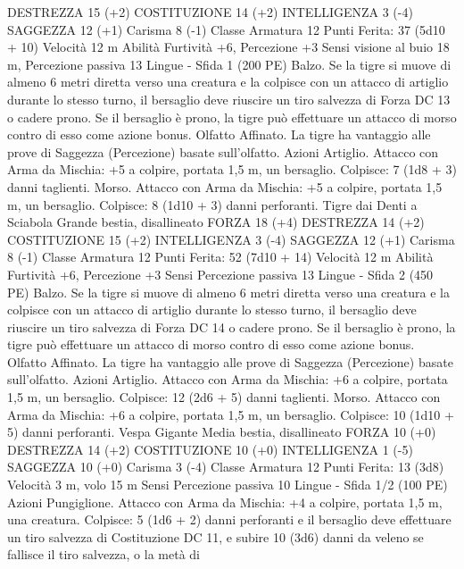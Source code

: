 \begin{multicols}{2}
DESTREZZA 15 (+2)
COSTITUZIONE 14 (+2)
INTELLIGENZA 3 (-4)
SAGGEZZA 12 (+1)
Carisma 8 (-1)
Classe Armatura 12
\hspace*{0pt}\hfill{Punti Ferita}: 37 (5d10 + 10)
Velocità 12 m
Abilità Furtività +6, Percezione +3
Sensi visione al buio 18 m, Percezione passiva 13
Lingue -
Sfida 1 (200 PE)
Balzo. Se la tigre si muove di almeno 6 metri diretta verso una
creatura e la colpisce con un attacco di artiglio durante lo stesso
turno, il bersaglio deve riuscire un tiro salvezza di Forza DC 13 o
cadere prono. Se il bersaglio è prono, la tigre può effettuare un
attacco di morso contro di esso come azione bonus.
Olfatto Affinato. La tigre ha vantaggio alle prove di Saggezza
(Percezione) basate sull’olfatto.
Azioni
Artiglio. Attacco con Arma da Mischia: +5 a colpire, portata 1,5
m, un bersaglio.
Colpisce: 7 (1d8 + 3) danni taglienti.
Morso. Attacco con Arma da Mischia: +5 a colpire, portata 1,5
m, un bersaglio.
Colpisce: 8 (1d10 + 3) danni perforanti.
Tigre dai Denti a
Sciabola
Grande bestia, disallineato
FORZA 18 (+4)
DESTREZZA 14 (+2)
COSTITUZIONE 15 (+2)
INTELLIGENZA 3 (-4)
SAGGEZZA 12 (+1)
Carisma 8 (-1)
Classe Armatura 12
\hspace*{0pt}\hfill{Punti Ferita}: 52 (7d10 + 14)
Velocità 12 m
Abilità Furtività +6, Percezione +3
Sensi Percezione passiva 13
Lingue -
Sfida 2 (450 PE)
Balzo. Se la tigre si muove di almeno 6 metri diretta verso una
creatura e la colpisce con un attacco di artiglio durante lo stesso
turno, il bersaglio deve riuscire un tiro salvezza di Forza DC 14 o
cadere prono. Se il bersaglio è prono, la tigre può effettuare un
attacco di morso contro di esso come azione bonus.
Olfatto Affinato. La tigre ha vantaggio alle prove di Saggezza
(Percezione) basate sull’olfatto.
Azioni
Artiglio. Attacco con Arma da Mischia: +6 a colpire, portata 1,5
m, un bersaglio.
Colpisce: 12 (2d6 + 5) danni taglienti.
Morso. Attacco con Arma da Mischia: +6 a colpire, portata 1,5
m, un bersaglio.
Colpisce: 10 (1d10 + 5) danni perforanti.
Vespa Gigante
Media bestia, disallineato
FORZA 10 (+0)
DESTREZZA 14 (+2)
COSTITUZIONE 10 (+0)
INTELLIGENZA 1 (-5)
SAGGEZZA 10 (+0)
Carisma 3 (-4)
Classe Armatura 12
\hspace*{0pt}\hfill{Punti Ferita}: 13 (3d8)
Velocità 3 m, volo 15 m
Sensi Percezione passiva 10
Lingue -
Sfida 1/2 (100 PE)
Azioni
Pungiglione. Attacco con Arma da Mischia: +4 a colpire, portata
1,5 m, una creatura.
Colpisce: 5 (1d6 + 2) danni perforanti e il bersaglio deve
effettuare un tiro salvezza di Costituzione DC 11, e subire 10
(3d6) danni da veleno se fallisce il tiro salvezza, o la metà di

\end{multicols}
